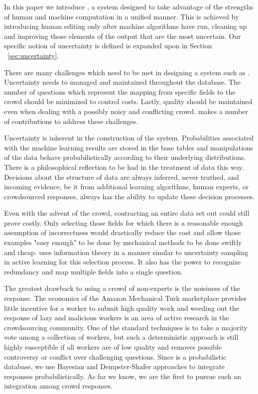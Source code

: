 In this paper we introduce \sysName, a system designed to take advantage of the strengths of human and machine computation in a unified manner.  This is achieved by introducing human editing only after machine algorithms have run, cleaning up and improving those elements of the output that are the most uncertain.  Our specific notion of uncertainty is defined is expanded upon in Section ~\ref{sec:uncertainty}.

There are many challenges which need to be met in designing a system such as \sysName .  Uncertainty needs to managed and maintained throughout the database.  The number of questions which represent the mapping from specific fields to the crowd should be minimized to control costs.  Lastly, quality should be maintained even when dealing with a possibly noisy and conflicting crowd.  \sysName makes a number of contributions to address these challenges.

Uncertainty is inherent in the construction of the system.  Probabilities associated with the machine learning results are stored in the base tables and manipulations of the data behave probabilistically according to their underlying distributions.  There is a philosophical reflection to be had in the treatment of data this way.  Decisions about the structure of data are always inferred, never truthed, and incoming evidence, be it from additional learning algorithms, human experts, or crowdsourced responses, always has the ability to update these decision processes.

Even with the advent of the crowd, contracting an entire data set out could still prove costly.  Only selecting those fields for which there is a reasonable enough assumption of incorrectness would drastically reduce the cost and allow those examples "easy enough" to be done by mechanical methods to be done swiftly and cheap.  \sysName uses information theory in a manner similar to uncertainty sampling in active learning for this selection process.  It also has the power to recognize redundancy and map multiple fields into a single question.

The greatest drawback to using a crowd of non-experts is the noisiness of the response.  The economics of the Amazon Mechanical Turk marketplace provides little incentive for a worker to submit high quality work and weeding out the response of lazy and malicious workers is an area of active research in the crowdsourcing community.  One of the standard techniques is to take a majority vote among a collection of workers, but such a deterministic approach is still highly susceptible if all workers are of low quality and removes possible controversy or conflict over challenging questions.  Since \sysName is a probabilistic database, we use Bayesian and Dempster-Shafer approaches to integrate responses probabilistically.  As far we know, we are the first to pursue such an integration among crowd responses.   

